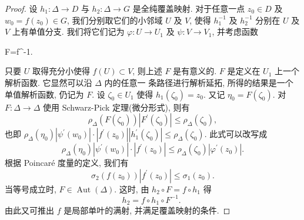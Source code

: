 \begin{proof}
    设 $h_1: \Delta \rightarrow D$ 与 $h_2: \Delta \rightarrow G$ 是全纯覆盖映射. 对于任意一点 $z_0 \in D$ 及 $w_0=f\left(z_0\right) \in G$, 我们分别取它们的小邻域 $U$ 及 $V$, 使得 $h_1^{-1}$ 及 $h_2^{-1}$ 分别在 $U$ 及 $V$ 上有单值分支. 我们将它们记为 $\varphi: U \rightarrow U_1$ 及 $\psi: V \rightarrow V_1$, 并考虑函数
    \begin{eq*}
        F=\psi\circ f\circ \varphi^{-1}.
    \end{eq*}
只要 $U$ 取得充分小使得 $f(U) \subset V$, 则上述 $F$ 是有意义的.
$F$ 是定义在 $U_1$ 上一个解析函数. 它显然可以沿 $\Delta$ 内的任意一 条路径进行解析延拓, 所得的结果是一个单值解析函数, 仍记为 $F$. 设 $\zeta_0 \in U_1$ 使得 $h_1\left(\zeta_0\right)=z_0$. 又记 $\eta_0=F\left(\zeta_0\right)$. 对 $F: \Delta \rightarrow \Delta$ 使用 Schwarz-Pick 定理(微分形式), 则有
$$
\rho_{\Delta}\left(F\left(\zeta_0\right)\right)\left|F^{\prime}\left(\zeta_0\right)\right| \leqslant \rho_{\Delta}\left(\zeta_0\right),
$$
也即 $\rho_{\Delta}\left(\eta_0\right)\left|\psi^{\prime}\left(w_0\right)\right| \cdot\left|f^{\prime}\left(z_0\right)\right|\left|h_1^{\prime}\left(\zeta_0\right)\right| \leqslant \rho_{\Delta}\left(\zeta_0\right)$. 此式可以改写成
$$
\rho_{\Delta}\left(\eta_0\right)\left|\psi^{\prime}\left(w_0\right)\right| \cdot\left|f^{\prime}\left(z_0\right)\right| \leqslant \rho_{\Delta}\left(\zeta_0\right)\left|\varphi^{\prime}\left(z_0\right)\right| .
$$
根据 Poincaré 度量的定义, 我们有
$$
\sigma_2\left(f\left(z_0\right)\right)\left|f^{\prime}\left(z_0\right)\right| \leqslant \sigma_1\left(z_0\right) .
$$
当等号成立时, $F \in \operatorname{Aut}(\Delta)$. 这时, 由 $h_2 \circ F=f \circ h_1$ 得
$$
h_2=f \circ h_1 \circ F^{-1} \text {. }
$$
由此又可推出 $f$ 是局部单叶的满射, 并满足覆盖映射的条件.
\end{proof}

